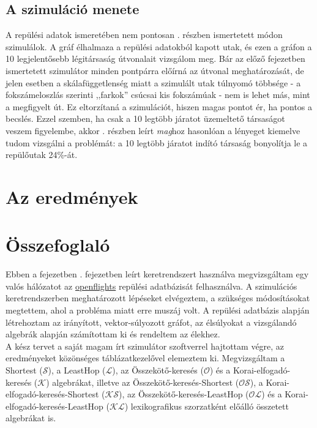     \subsection{A szimuláció menete}
    A repülési adatok ismeretében nem pontosan . részben ismertetett módon szimulálok. A gráf élhalmaza a repülési adatokból kapott utak, és ezen a gráfon a 10 legjelentősebb légitársaság útvonalait vizsgálom meg. Bár az előző fejezetben ismertetett szimulátor minden pontpárra előírná az útvonal meghatározását, de jelen esetben a skálafüggetlenség miatt a szimulált utak túlnyomó többsége - a fokszámeloszlás szerinti ,,farkok'' csúcsai kis fokszámúak - nem is lehet más, mint a megfigyelt út. Ez eltorzítaná a szimulációt, hiszen magas pontot ér, ha pontos a becslés. Ezzel szemben, ha csak a 10 legtöbb járatot üzemeltető társaságot veszem figyelembe, akkor . részben leírt \textit{mag}hoz hasonlóan a lényeget kiemelve tudom vizsgálni a problémát: a 10 legtöbb járatot indító társaság bonyolítja le a repülőutak 24\%-át.

  \section{Az eredmények}

        \todo

  \section{Összefoglaló}
  Ebben a fejezetben . fejezetben leírt keretrendszert használva megvizsgáltam egy valós hálózatot az \href{http://openflights.org/}{openflights} repülési adatbázisát felhasználva. A szimulációs keretrendszerben meghatározott lépéseket elvégeztem, a szükséges módosításokat megtettem, ahol a probléma miatt erre muszáj volt. A repülési adatbázis alapján létrehoztam az irányított, vektor-súlyozott gráfot, az élsúlyokat a vizsgálandó algebrák alapján számítottam ki és rendeltem az élekhez.\\

  A kész tervet a saját magam írt szimulátor szoftverrel hajtottam végre, az eredményeket közönséges táblázatkezelővel elemeztem ki. Megvizsgáltam a Shortest ($\mathcal{S}$), a LeastHop ($\mathcal{L}$), az Összekötő-keresés ($\mathcal{O}$) és a Korai-elfogadó-keresés ($\mathcal{K}$) algebrákat, illetve az Összekötő-keresés-Shortest ($\mathcal{OS}$), a Korai-elfogadó-keresés-Shortest ($\mathcal{KS}$), az Összekötő-keresés-LeastHop ($\mathcal{OL}$) és a Korai-elfogadó-keresés-LeastHop ($\mathcal{KL}$) lexikografikus szorzatként előálló összetett algebrákat is.
